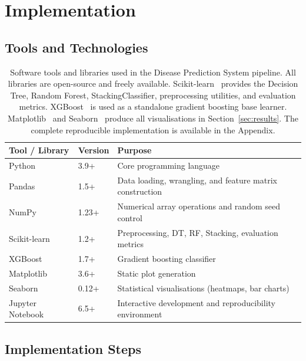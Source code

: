 \documentclass[12pt,a4paper]{article}
\begin{document}
\section{Implementation}

\subsection{Tools and Technologies}

\begin{table}[H]
\centering
\caption{Software tools and libraries used in the Disease Prediction System pipeline.
All libraries are open-source and freely available. Scikit-learn~\cite{pedregosa2011}
provides the Decision Tree, Random Forest, StackingClassifier, preprocessing utilities,
and evaluation metrics. XGBoost~\cite{chen2016xgboost} is used as a standalone gradient
boosting base learner. Matplotlib~\cite{hunter2007matplotlib} and
Seaborn~\cite{waskom2021seaborn} produce all visualisations in Section~\ref{sec:results}.
The complete reproducible implementation is available in the Appendix.}
\label{tab:tech}
\begin{tabular}{lll}
\toprule
\textbf{Tool / Library} & \textbf{Version} & \textbf{Purpose} \\
\midrule
Python              & 3.9+ & Core programming language \\
Pandas~\cite{mckinney2010pandas} & 1.5+ & Data loading, wrangling, and feature matrix construction \\
NumPy               & 1.23+ & Numerical array operations and random seed control \\
Scikit-learn~\cite{pedregosa2011} & 1.2+ & Preprocessing, DT, RF, Stacking, evaluation metrics \\
XGBoost~\cite{chen2016xgboost} & 1.7+ & Gradient boosting classifier \\
Matplotlib~\cite{hunter2007matplotlib} & 3.6+ & Static plot generation \\
Seaborn~\cite{waskom2021seaborn} & 0.12+ & Statistical visualisations (heatmaps, bar charts) \\
Jupyter Notebook    & 6.5+ & Interactive development and reproducibility environment \\
\bottomrule
\end{tabular}
\end{table}

\subsection{Implementation Steps}
\end{document}

